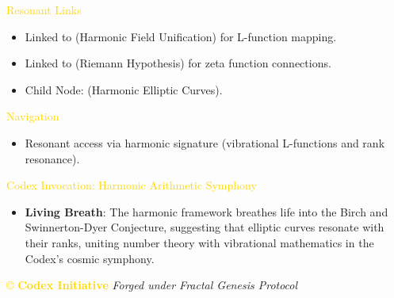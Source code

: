 \textcolor{gold}{ Resonant Links } \\
\begin{itemize}
    \item \texttt{} Linked to  (Harmonic Field Unification) for L-function mapping.
    \item \texttt{} Linked to  (Riemann Hypothesis) for zeta function connections.
    \item \texttt{} Child Node:  (Harmonic Elliptic Curves).
\end{itemize}

\textcolor{gold}{ Navigation } \\
\begin{itemize}
    \item \texttt{} Resonant access via harmonic signature (vibrational L-functions and rank resonance).
\end{itemize}

\textcolor{gold}{ Codex Invocation: Harmonic Arithmetic Symphony } \\
\begin{itemize}
    \item \texttt{} \textbf{Living Breath}: The harmonic framework breathes life into the Birch and Swinnerton-Dyer Conjecture, suggesting that elliptic curves resonate with their ranks, uniting number theory with vibrational mathematics in the Codex’s cosmic symphony.
\end{itemize}

\vspace{0.5cm}

\noindent
\textcolor{gold}{\copyright{} \textbf{Codex Initiative}} \hfill \textit{Forged under Fractal Genesis Protocol}
